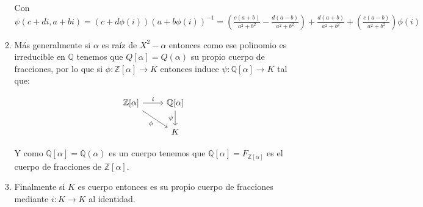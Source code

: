 \documentclass[11pt]{article}
\newcommand{\Q}{\mathbb{Q}}
\newcommand{\Z}{\mathbb{Z}}
\newcommand{\qed}{\nobreak \ifvmode \relax \else
	\ifdim\lastskip<1.5em \hskip-\lastskip
	\hskip1.5em plus0em minus0.5em \fi \nobreak
	\vrule height0.75em width0.5em depth0.25em\fi}
\begin{document}
\begin{enumerate}
\begin{enumerate}
		Con $\psi(c+di,a+bi) = (c+d\phi(i))(a+b\phi(i))^{-1} =  \left( \frac{c(a + b)}{a^2 + b^2} - \frac{d(a - b)}{a^2 + b^2} \right) + \frac{d(a + b)}{a^2 + b^2} + \left( \frac{c(a - b)}{a^2 + b^2} \right) \phi(i)$
		
		\item M\'as generalmente si $\alpha$ es ra\'iz de $X^{2} - \alpha$ entonces como ese polinomio es irreducible en $\Q$ tenemos que $Q[\alpha]= Q(\alpha)$ su propio cuerpo de fracciones, por lo que si $\phi: \Z[\alpha] \rightarrow K$ entonces induce $\psi: \Q[\alpha] \rightarrow K$ tal que:	
		
		
		\begin{equation*}
		\begin{tikzcd}
		\Z[\alpha] \arrow[swap] {dr} {\phi} \arrow{r} {i}   & \Q[\alpha] \arrow[swap] {d} {\psi} \\
		& K 
		\end{tikzcd}
		\end{equation*}			
		
		Y como $\Q[\alpha] = \Q(\alpha)$ es un cuerpo tenemos que $\Q[\alpha] = F_{\Z[\alpha]}$ es el cuerpo de fracciones de $\Z[\alpha]$.
		
		\item Finalmente si $K$ es cuerpo entonces es su propio cuerpo de fracciones mediante $i : K\rightarrow K$ al identidad. \qed
		
	\end{enumerate}
	
\end{enumerate}
	
\end{document}
